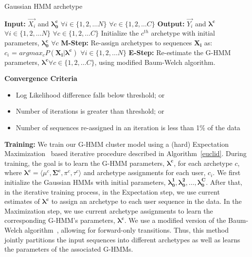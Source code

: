 \documentclass[10pt,letterpaper]{article}
\begin{document}
\begin{algorithm}[tbh]
 \caption{Gaussian HMM archetype}\label{euclid}
 \SetAlgoLined
 \textbf{Input:} $\vec{X_i}$ and $\mathbf{\lambda^c_0}$ $\forall i \in \{1, 2, \ldots N\}$ $\forall c \in \{1, 2, \ldots C\}$\;
 \textbf{Output:} $\vec{Y_i}$ and $\mathbf{\lambda^c}$ $\forall i \in \{1, 2, \ldots N\}$ $\forall c \in \{1, 2, \ldots C\}$\;
 Initialize the $c^{th}$ archetype with initial parameters, $\mathbf{\lambda^c_0}$ $\forall c$\;
  {
  \textbf{M-Step:} Re-assign archetypes to sequences $\mathbf{X_i}$ as: \\
  $c_i$ =  $argmax_{c} P(\mathbf{X_i} | \mathbf{\lambda^c})$ $\forall i \in \{1, 2, \ldots N\}$\;
  \textbf{E-Step:} Re-estimate the G-HMM parameters, $\mathbf{\lambda^c} \forall c \in \{1, 2, \ldots C\}$, using modified Baum-Welch algorithm.\;
 }

 \textbf {Convergence Criteria}\;
 \begin{itemize}
   \itemsep0em
  \item Log Likelihood difference falls below threshold; or\
  \item Number of iterations is greater than threshold; or\
  \item Number of sequences re-assigned in an iteration is less than 1\% of the data\
 \end{itemize}
\end{algorithm}

\textbf{Training:} We train our G-HMM cluster model using a (hard) Expectation Maximization~\cite{Dempster:1977} based iterative procedure described in Algorithm~\ref{euclid}. During training, the goal is to learn the G-HMM parameters, $ \mathbf{\lambda^c}$, for each archetype $c$, where $\mathbf{\lambda^c} = \langle\mu^c, \mathbf{\Sigma^c}, \pi^c, \tau^c \rangle$ and archetype assignments for each user, $c_i$. We first initialize the Gaussian HMMs with initial parameters, $ \mathbf{\lambda_0^1}, \mathbf{\lambda_0^2}, \ldots, \mathbf{\lambda_0^C}$. After that, in the iterative training process, in the Expectation step, we use current estimates of $\mathbf{\lambda^c}$ to assign an archetype to each user sequence in the data. In the Maximization step, we use current archetype assignments to learn the corresponding G-HMM's parameters, $\mathbf{\lambda^c}$. We use a modified version of the Baum-Welch algorithm~\cite{Rabiner:1990}, allowing for forward-only transitions. Thus, this method jointly partitions the input sequences into different archetypes as well as learns the parameters of the associated G-HMMs.
\end{document}
